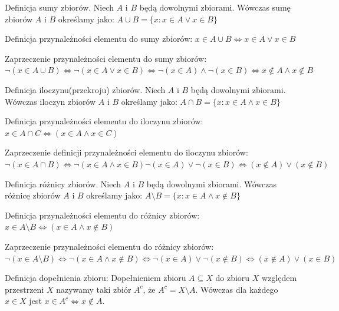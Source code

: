 \begin{definition}
Definicja sumy zbiorów.
Niech $A$ i $B$ będą dowolnymi zbiorami. Wówczas sumę zbiorów $A$ i $B$ określamy jako:
$A\cup B=\{x:x\in A\vee x\in B\}$
\end{definition}
\begin{definition}
Definicja przynależności elementu do sumy zbiorów:
$x\in A\cup B\Leftrightarrow x\in A\vee x\in B$
\end{definition}
\begin{remark}
Zaprzeczenie przynależności elementu do sumy zbiorów:
\(
\neg(x \in A \cup B)\Leftrightarrow\neg(x \in A \vee x \in B)\Leftrightarrow
\neg(x \in A) \wedge \neg(x \in B)\Leftrightarrow x \notin A \wedge x \notin B
\)
\end{remark}
\begin{definition}
Definicja iloczynu(przekroju) zbiorów.
Niech $A$ i $B$ będą dowolnymi zbiorami. Wówczas iloczyn zbiorów $A$ i $B$ określamy jako:
$A\cap B=\{x:x\in A\wedge x\in B\}$
\end{definition}
\begin{definition}
Definicja przynależności elementu do iloczynu zbiorów:
$x\in A\cap C\Leftrightarrow (x\in A\wedge x\in C)$
\end{definition}
\begin{remark}
Zaprzeczenie definicji przynależności elementu do iloczynu zbiorów:
\(
\neg(x\in A\cap B)\Leftrightarrow\neg(x\in A\wedge x\in B)\neg(x\in A)\vee\neg(x\in B)\Leftrightarrow(x\notin A)
\vee(x\notin B)
\)
\end{remark}
\begin{definition}
Definicja różnicy zbiorów.
Niech $A$ i $B$ będą dowolnymi zbiorami. Wówczas różnicę zbiorów $A$ i $B$ określamy jako:
$A\setminus B=\{x:x\in A\wedge x\notin B\}$
\end{definition}
\begin{definition}
Definicja przynależności elementu do różnicy zbiorów:
$x\in A\setminus B\Leftrightarrow (x\in A\wedge x\notin B)$
\end{definition}
\begin{remark}
Zaprzeczenie przynależności elementu do różnicy zbiorów:
\(
\neg(x\in A\setminus B)\Leftrightarrow\neg(x\in A\wedge x\notin B)
\Leftrightarrow\neg(x\in A)\vee \neg(x\notin B)\Leftrightarrow
(x\notin A)\vee (x\in B)
\)
\end{remark}
\begin{definition}
Definicja dopełnienia zbioru:
Dopełnieniem zbioru $A\subseteq X$ do zbioru $X$ względem przestrzeni $X$ nazywamy taki zbiór $A^c$, że $A^c=X\setminus A$. Wówczas dla każdego $x\in X$ jest $x\in A^c\Leftrightarrow x\notin A$.
\end{definition}
